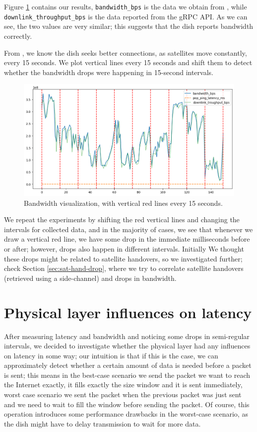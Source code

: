 \documentclass[IN,11pt,twoside,openright,idp,english]{tumthesis}
\begin{document}
Figure \ref{fig:vis-bw-15sec} contains our results, \texttt{bandwidth\_bps} is the data we obtain from , while \texttt{downlink\_throughput\_bps} is the data reported from the gRPC API. As we can see, the two values are very similar; this suggests that the dish reports bandwidth correctly.

From \cite{llc-application}, we know the dish seeks better connections, as satellites move constantly, every 15 seconds. We plot vertical lines every 15 seconds and shift them to detect whether the bandwidth drops were happening in 15-second intervals.

\begin{figure}
    \centering
    \includegraphics[width=1.0\columnwidth]{img/bw-15seconds.png}
    \caption{Bandwidth visualization, with vertical red lines every 15 seconds.}
    \label{fig:vis-bw-15sec}
\end{figure}

We repeat the experiments by shifting the red vertical lines and changing the intervals for collected data, and in the majority of cases, we see that whenever we draw a vertical red line, we have some drop in the immediate milliseconds before or after; however, drops also happen in different intervals. Initially We thought these drops might be related to satellite handovers, so we investigated further; check Section \ref{sec:sat-hand-drop}, where we try to correlate satellite handovers (retrieved using a side-channel) and drops in bandwidth. 

\section{Physical layer influences on latency}

After measuring latency and bandwidth and noticing some drops in semi-regular intervals, we decided to investigate whether the physical layer had any influences on latency in some way; our intuition is that if this is the case, we can approximately detect whether a certain amount of data is needed before a packet is sent; this means in the best-case scenario we send the packet we want to reach the Internet exactly, it fills exactly the size window and it is sent immediately, worst case scenario we sent the packet when the previous packet was just sent and we need to wait to fill the window before sending the packet. Of course, this operation introduces some performance drawbacks in the worst-case scenario, as the dish might have to delay transmission to wait for more data.
\end{document}
